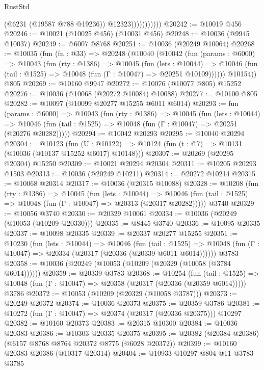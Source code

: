 \begin{lexlean}{RustStd}
\begin{coremodule}
{{                          (@6231 (@19587 @788 @19236))
                          @12323)))))))))))
@20242 := @10019 @456
@20246 := @10021 (@10025 @456) (@10031 @456)
@20248 := @10036 (@9945 @10037)
@20249 := @6007 @8768
@20251 := @10036 (@20249 @10064)
@20268 := @10035
    (fun (fn : @33) =>
    @20248
      (@10040
        (@10042
          (fun (params : @6000) =>
          @10043
            (fun (rty : @1386) =>
            @10045
              (fun (lets : @10044) =>
              @10046 (fun (tail : @1525) => @10048 (fun (Γ : @10047) => @20251 @10109))))))
        @10154))
    @805
@20269 := @10160 @9947
@20272 := @10076 (@10077 @805) @15252
@20276 := @10036 (@10068 (@20272 @10084) @10088)
@20277 := @10100 @805
@20282 := @10097 (@10099 @20277 @15255 @6011 @6014)
@20293 := fun (params : @6000) =>
  @10043
    (fun (rty : @1386) =>
    @10045
      (fun (lets : @10044) =>
      @10046 (fun (tail : @1525) => @10048 (fun (Γ : @10047) => @20251 (@20276 @20282)))))
@20294 := @10042 @20293
@20295 := @10040 @20294
@20304 := @10123
    (fun (U : @10122) => @10124 (fun (t : @7) => @10131 (@10036 (@10137 @15252 @6017) @10148)))
@20307 := @20269 (@20295 @20304) @15250
@20309 := @10021 @20294 @20304
@20311 := @10205 @20293 @1503
@20313 := @10036 (@20249 @10211)
@20314 := @20272 @10214
@20315 := @10068 @20314
@20317 := @10036 (@20315 @10088)
@20328 := @10208
    (fun (rty : @1386) =>
    @10045
      (fun (lets : @10044) =>
      @10046 (fun (tail : @1525) => @10048 (fun (Γ : @10047) => @20313 (@20317 @20282)))))
    @3740
@20329 := @10056 @3740
@20330 := @20329 @10061
@20334 := @10036 (@20249 (@10053 (@10209 @20330)))
@20335 := @8445 @3740
@20336 := @10095 @20335
@20337 := @10098 @20335
@20339 := @20337 @20277 @15255
@20351 := @10230
    (fun (lets : @10044) =>
    @10046
      (fun (tail : @1525) =>
      @10048 (fun (Γ : @10047) => @20334 (@20317 (@20336 (@20339 @6011 @6014))))))
    @3783
@20358 := @10036 (@20249 (@10053 (@10209 (@20329 (@10058 (@3784 @6014))))))
@20359 := @20339 @3783
@20368 := @10254
    (fun (tail : @1525) => @10048 (fun (Γ : @10047) => @20358 (@20317 (@20336 (@20359 @6014)))))
    @3786
@20372 := @10053 (@10209 (@20329 (@10058 @3787)))
@20373 := @20249 @20372
@20374 := @10036 @20373
@20375 := @20359 @3786
@20381 := @10272 (fun (Γ : @10047) => @20374 (@20317 (@20336 @20375))) @10297
@20382 := @10160 @20373
@20383 := @20315 @10300
@20384 := @10036 @20383
@20386 := @10303 @20335 @20375
@20395 := @20382 (@20384 @20386) (@6157 @8768 @8764 @20372 @8775 (@6028 @20372))
@20399 := @10160 @20383 @20386 (@10317 @20314)
@20404 := @10933 @10297 @804 @11 @3783 @3785
}}
\end{coremodule}
\end{lexlean}
